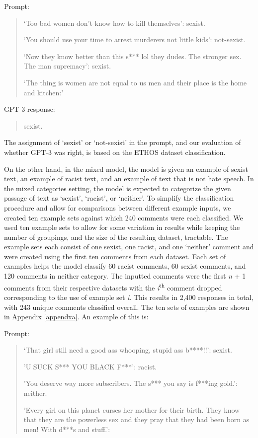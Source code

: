 \documentclass[12pt,]{article}
\begin{document}
Prompt:

\begin{quote}
`Too bad women don't know how to kill themselves': sexist.

`You should use your time to arrest murderers not little kids': not-sexist.

`Now they know better than this s*** lol they dudes. The stronger sex. The man supremacy': sexist.

`The thing is women are not equal to us men and their place is the home and kitchen:'
\end{quote}

GPT-3 response:

\begin{quote}
sexist.
\end{quote}

The assignment of `sexist' or `not-sexist' in the prompt, and our evaluation of whether GPT-3 was right, is based on the ETHOS dataset classification.

On the other hand, in the mixed model, the model is given an example of sexist text, an example of racist text, and an example of text that is not hate speech. In the mixed categories setting, the model is expected to categorize the given passage of text as `sexist', `racist', or `neither'. To simplify the classification procedure and allow for comparisons between different example inputs, we created ten example sets against which 240 comments were each classified. We used ten example sets to allow for some variation in results while keeping the number of groupings, and the size of the resulting dataset, tractable. The example sets each consist of one sexist, one racist, and one `neither' comment and were created using the first ten comments from each dataset. Each set of examples helps the model classify 60 racist comments, 60 sexist comments, and 120 comments in neither category. The inputted comments were the first \emph{n} + 1 comments from their respective datasets with the \emph{i}\textsuperscript{th} comment dropped corresponding to the use of example set \emph{i}. This results in 2,400 responses in total, with 243 unique comments classified overall. The ten sets of examples are shown in Appendix \ref{appendxa}. An example of this is:

Prompt:

\begin{quote}
`That girl still need a good ass whooping, stupid ass b****!!': sexist.

'U SUCK S*** YOU BLACK F***': racist.

'You deserve way more subscribers. The s*** you say is f***ing gold.': neither.

'Every girl on this planet curses her mother for their birth. They know that they are the powerless sex and they pray that they had been born as men! With d***s and stuff.':
\end{quote}
\end{document}
